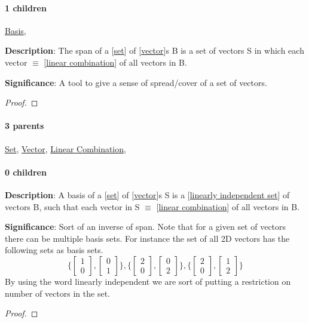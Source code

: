\documentclass[../main.tex]{subfiles}
\newcommand{\bvectwo}[2]{\begin{bmatrix} #1 \\ #2 \end{bmatrix}}
\begin{document}
\paragraph{1 children} \hyperref[statement:Basis]{Basis}, 



\begin{statement}
\label{statement:Span}\hspace*{0pt}\par
\end{statement}
\textbf{Description}:
The span of a [\hyperref[statement:Set]{set}] of [\hyperref[statement:Vector]{vector}]s B is a set of vectors S in which each vector $ \equiv $ [\hyperref[statement:Linear Combination]{linear combination}] of all vectors in B.
\par
{\color{magenta} \textbf{Significance}:
A tool to give a sense of spread/cover of a set of vectors.
\par}
\begin{proof}
\proofbydefinition
\end{proof}\par
\paragraph{3 parents} \hyperref[statement:Set]{Set}, \hyperref[statement:Vector]{Vector}, \hyperref[statement:Linear Combination]{Linear Combination}, 
\paragraph{0 children} 



\begin{statement}
\label{statement:Basis}\hspace*{0pt}\par
\end{statement}
\textbf{Description}:
A basis of a [\hyperref[statement:Set]{set}] of [\hyperref[statement:Vector]{vector}]s S is a [\hyperref[statement:Linearly Independent Set]{linearly independent set}] of vectors B, such that each vector in S $ \equiv $ [\hyperref[statement:Linear Combination]{linear combination}] of all vectors in B.
\par
{\color{magenta} \textbf{Significance}:
Sort of an inverse of span.
Note that for a given set of vectors there can be multiple basis sets.
For instance the set of all 2D vectors has the following sets as basis sets.
\[
  \{ \bvectwo{1}{0}, \bvectwo{0}{1} \}, \{ \bvectwo{2}{0}, \bvectwo{0}{2} \}, \{ \bvectwo{2}{0}, \bvectwo{1}{2} \}
\]
By using the word linearly independent we are sort of putting a restriction on number of vectors in the set.
\par}
\begin{proof}
\proofbydefinition
\end{proof}\par
\end{document}
